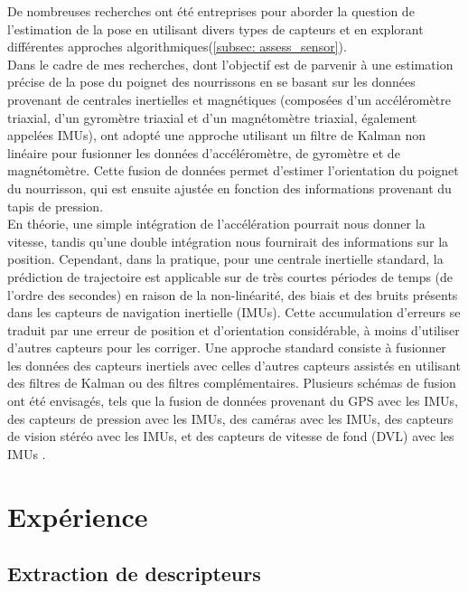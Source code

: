\documentclass[8pt]{article}
\begin{document}
De nombreuses recherches ont été entreprises pour aborder la question de l'estimation de la pose en utilisant divers types de capteurs et en explorant différentes approches algorithmiques(\ref{subsec: assess_sensor}).\\ 
Dans le cadre de mes recherches, dont l'objectif est de parvenir à une estimation précise de la pose du poignet des nourrissons en se basant sur les données provenant de centrales inertielles et magnétiques (composées d'un accéléromètre triaxial, d'un gyromètre triaxial et d'un magnétomètre triaxial, également appelées IMUs),  \textcite{rihar_caretoy_2016} ont adopté une approche utilisant un filtre de Kalman non linéaire pour fusionner les données d'accéléromètre, de gyromètre et de magnétomètre. Cette fusion de données permet d'estimer l'orientation du poignet du nourrisson, qui est ensuite ajustée en fonction des informations provenant du tapis de pression.\\
En théorie, une simple intégration de l'accélération pourrait nous donner la vitesse, tandis qu'une double intégration nous fournirait des informations sur la position. Cependant, dans la pratique, pour une centrale inertielle standard, la prédiction de trajectoire est applicable sur de très courtes périodes de temps (de l'ordre des secondes) en raison de la non-linéarité, des biais et des bruits présents dans les capteurs de navigation inertielle (IMUs). Cette accumulation d'erreurs se traduit par une erreur de position et d'orientation considérable, à moins d'utiliser d'autres capteurs pour les corriger. Une approche standard consiste à fusionner les données des capteurs inertiels avec celles d'autres capteurs assistés en utilisant des filtres de Kalman ou des filtres complémentaires. Plusieurs schémas de fusion ont été envisagés, tels que la fusion de données provenant du GPS avec les IMUs, des capteurs de pression avec les IMUs, des caméras avec les IMUs, des capteurs de vision stéréo avec les IMUs, et des capteurs de vitesse de fond (DVL) avec les IMUs \cite{noauthor_comparative_2014}. 



\newpage
\section{Expérience}
\label{expé}
\subsection{Extraction de descripteurs}
\end{document}
